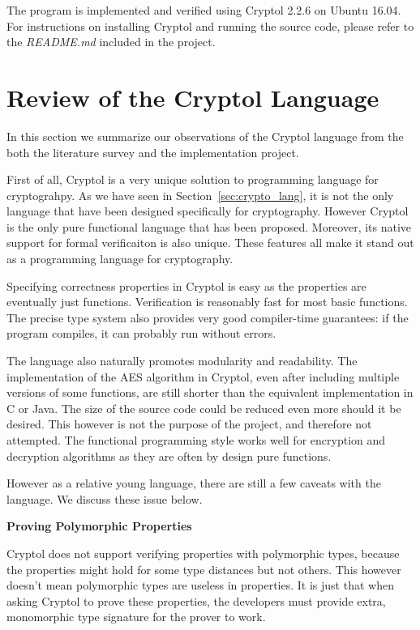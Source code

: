 \documentclass[a4paper, notitlepage]{report}
\renewcommand{\paragraph}[1]{\vspace*{1em}\noindent\textbf{#1}\hspace*{1em}}
\begin{document}
The program is implemented and verified using Cryptol 2.2.6 on
Ubuntu 16.04.
For instructions on installing Cryptol and running the source code,
please refer to the \emph{README.md} included in the project.

\section{Review of the Cryptol Language}
\label{sec:review}

In this section we summarize our observations of the Cryptol language from the both
 the literature survey and the implementation project. 

First of all, Cryptol is a very unique solution to programming language for cryptograhpy.
As we have seen in Section~\ref{sec:crypto_lang}, it is not the only language that have
been designed specifically for cryptography. However Cryptol is the only pure functional
language that has been proposed. Moreover, its native support for formal verificaiton is
also unique. These features all make it stand out as a programming language for 
cryptography.

Specifying correctness properties in Cryptol is easy as the properties are eventually
just functions. Verification is reasonably fast for most basic functions. 
The precise type system also provides very good compiler-time guarantees: if the program 
compiles, it can probably run without errors.

The language also naturally promotes modularity and readability.
The implementation of the AES algorithm in Cryptol, even after including multiple 
versions of some functions, are still shorter than the equivalent implementation
in C or Java. The size of the source code could be reduced even more should it be
 desired. This however is not the purpose of the project, and therefore not attempted.
The functional programming style works well for encryption and decryption algorithms
as they are often by design pure functions.

However as a relative young language, there are still a few caveats with the language.
We discuss these issue below.

\paragraph{Proving Polymorphic Properties}

Cryptol does not support verifying properties with polymorphic types, because the 
properties might hold for some type distances but not others. This however doesn't mean
polymorphic types are useless in properties. It is just that when asking Cryptol
to prove these properties, the developers must provide extra, monomorphic type
signature for the prover to work.
\end{document}
